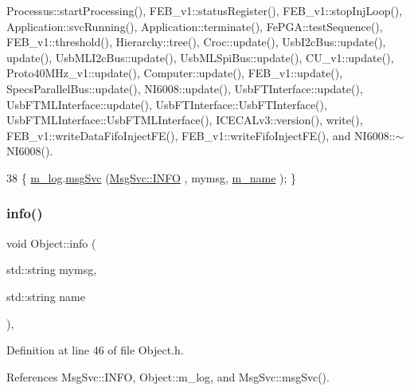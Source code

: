 Processus\+::start\+Processing(), F\+E\+B\+\_\+v1\+::status\+Register(), F\+E\+B\+\_\+v1\+::stop\+Inj\+Loop(), Application\+::svc\+Running(), Application\+::terminate(), Fe\+P\+G\+A\+::test\+Sequence(), F\+E\+B\+\_\+v1\+::threshold(), Hierarchy\+::tree(), Croc\+::update(), Usb\+I2c\+Bus\+::update(), update(), Usb\+M\+L\+I2c\+Bus\+::update(), Usb\+M\+L\+Spi\+Bus\+::update(), C\+U\+\_\+v1\+::update(), Proto40\+M\+Hz\+\_\+v1\+::update(), Computer\+::update(), F\+E\+B\+\_\+v1\+::update(), Specs\+Parallel\+Bus\+::update(), N\+I6008\+::update(), Usb\+F\+T\+Interface\+::update(), Usb\+F\+T\+M\+L\+Interface\+::update(), Usb\+F\+T\+Interface\+::\+Usb\+F\+T\+Interface(), Usb\+F\+T\+M\+L\+Interface\+::\+Usb\+F\+T\+M\+L\+Interface(), I\+C\+E\+C\+A\+Lv3\+::version(), write(), F\+E\+B\+\_\+v1\+::write\+Data\+Fifo\+Inject\+F\+E(), F\+E\+B\+\_\+v1\+::write\+Fifo\+Inject\+F\+E(), and N\+I6008\+::$\sim$\+N\+I6008().


\begin{DoxyCode}
38 \{ \hyperlink{classObject_a0d269813dd7ac1f24bc143031e2963f2}{m\_log}.\hyperlink{classMsgSvc_ad25f18047920cc59a314e5098259711c}{msgSvc} (\hyperlink{classMsgSvc_ae671eb7301996cd049d2da8a65925926ad2fcf3f3e734fc41ee097cc23670ce51}{MsgSvc::INFO}    , mymsg, \hyperlink{classObject_a8b83c95c705d2c3ba0d081fe1710f48d}{m\_name} ); \}
\end{DoxyCode}
\mbox{\label{classObject_a1ca123253dfd30fc28b156f521dcbdae}} 
\subsubsection{\texorpdfstring{info()}{info()}\hspace{0.1cm}{\footnotesize\ttfamily [2/2]}}
{\footnotesize\ttfamily void Object\+::info (\begin{DoxyParamCaption}\item[{std\+::string}]{mymsg,  }\item[{std\+::string}]{name }\end{DoxyParamCaption})\hspace{0.3cm}{\ttfamily [inline]}, {\ttfamily [inherited]}}



Definition at line 46 of file Object.\+h.



References Msg\+Svc\+::\+I\+N\+FO, Object\+::m\+\_\+log, and Msg\+Svc\+::msg\+Svc().


